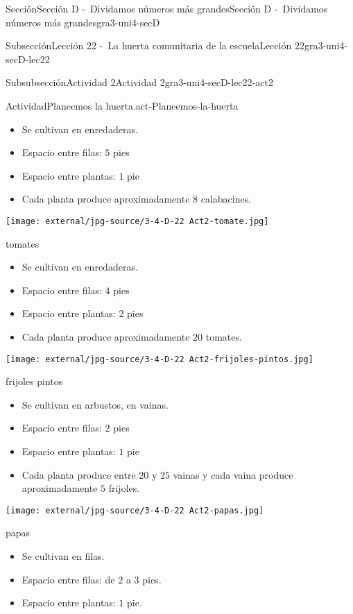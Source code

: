 \documentclass[twoside,10pt,]{article}
\begin{document}
\begin{sectionptx}{Sección}{Sección D -~Dividamos números más grandes}{}{Sección D -~Dividamos números más grandes}{}{}{gra3-uni4-secD}
\begin{subsectionptx}{Subsección}{Lección 22 -~La huerta comunitaria de la escuela}{}{Lección 22}{}{}{gra3-uni4-secD-lec22}
\begin{subsubsectionptx}{Subsubsección}{Actividad 2}{}{Actividad 2}{}{}{gra3-uni4-secD-lec22-act2}
\begin{activity}{Actividad}{Planeemos la huerta.}{act-Planeemos-la-huerta}
\begin{sidebyside}{2}{0}{0}{0}
\begin{sbspanel}{0.5}
\begin{itemize}[label=\textbullet]
\item{}Se cultivan en enredaderas.%
\item{}Espacio entre filas: \(5\) pies%
\item{}Espacio entre plantas: \(1\) pie%
\item{}Cada planta produce aproximadamente \(8\) calabacines.%
\end{itemize}
\end{sbspanel}%
\begin{sbspanel}{0.5}%
\texttt{[image: external/jpg-source/3-4-D-22 Act2-tomate.jpg]}
%
\par
tomates%
%
\begin{itemize}[label=\textbullet]
\item{}Se cultivan en enredaderas.%
\item{}Espacio entre filas: \(4\) pies%
\item{}Espacio entre plantas: \(2\) pies%
\item{}Cada planta produce aproximadamente \(20\) tomates.%
\end{itemize}
\end{sbspanel}%
\end{sidebyside}%
\begin{sidebyside}{2}{0}{0}{0}%
\begin{sbspanel}{0.5}%
\texttt{[image: external/jpg-source/3-4-D-22 Act2-frijoles-pintos.jpg]}
%
\par
frijoles pintos%
%
\begin{itemize}[label=\textbullet]
\item{}Se cultivan en arbustos, en vainas.%
\item{}Espacio entre filas: \(2\) pies%
\item{}Espacio entre plantas: \(1\) pie%
\item{}Cada planta produce entre \(20\) y \(25\) vainas y cada vaina produce aproximadamente \(5\) frijoles.%
\end{itemize}
\end{sbspanel}%
\begin{sbspanel}{0.5}%
\texttt{[image: external/jpg-source/3-4-D-22 Act2-papas.jpg]}
%
\par
papas%
%
\begin{itemize}[label=\textbullet]
\item{}Se cultivan en filas.%
\item{}Espacio entre filas: de \(2\) a \(3\) pies.%
\item{}Espacio entre plantas: \(1\) pie.%

\end{itemize}
\end{sbspanel}
\end{sidebyside}
\end{activity}
\end{subsubsectionptx}
\end{subsectionptx}
\end{sectionptx}
\end{document}
